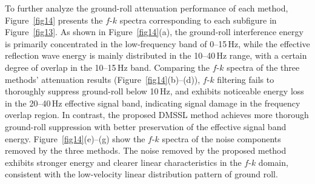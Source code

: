 \documentclass[alpha-refs]{wiley-article}
\begin{document}
To further analyze the ground-roll attenuation performance of each method, 
Figure~\ref{fig14} presents the $f$-$k$ spectra corresponding to each subfigure in 
Figure~\ref{fig13}. As shown in Figure~\ref{fig14}(a), the ground-roll interference energy is 
primarily concentrated in the low-frequency band of 0--15\,\si{\Hz}, while the effective 
reflection wave energy is mainly distributed in the 10--40\,\si{\Hz} range, with a certain degree 
of overlap in the 10--15\,\si{\Hz} band. Comparing the $f$-$k$ spectra of the three methods' 
attenuation results (Figure~\ref{fig14}(b)--(d)), $f$-$k$ filtering fails to thoroughly 
suppress ground-roll below 10\,\si{\Hz}, and exhibits noticeable energy loss in the 20--40\,\si{\Hz} 
effective signal band, indicating signal damage in the frequency overlap region. In 
contrast, the proposed DMSSL method achieves more thorough ground-roll suppression with 
better preservation of the effective signal band energy. Figure~\ref{fig14}(e)--(g) show the 
$f$-$k$ spectra of the noise components removed by the three methods. The noise 
removed by the proposed method exhibits stronger energy and clearer linear characteristics 
in the $f$-$k$ domain, consistent with the low-velocity linear distribution pattern of ground 
roll.
\end{document}

